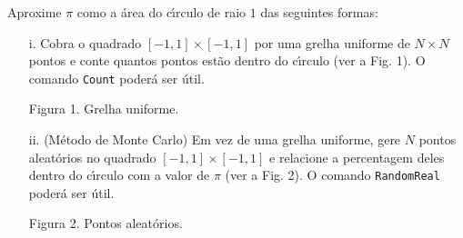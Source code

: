 \documentclass[11pt]{article}
\begin{document}
\begin{itemize}
  
 Aproxime $\pi$ como a \'area do c\'\i rculo de raio $1$ das seguintes formas:
   
        \begin{itemize}
        
        
        \item[{i.}] Cobra o quadrado $[-1,1] \times [-1,1]$  por uma grelha uniforme de $N\times N$ pontos
e conte quantos pontos est\~ao dentro do c\'\i rculo (ver a Fig. 1). O comando \texttt{Count} poder\'a ser \'util. 

\bigskip
\bigskip

\begin{minipage}{\textwidth}
\centering 
Figura 1. Grelha uniforme.
\end{minipage}

\pagebreak 
        \item[{ii.}]  (M\'etodo de Monte Carlo) Em vez de uma grelha uniforme, gere $N$ pontos aleat\'orios no quadrado $[-1,1] \times [-1,1]$ e relacione a percentagem deles dentro do c\'\i rculo com a valor de $\pi$ (ver a Fig. 2). O comando \texttt{RandomReal} poder\'a ser \'util.         
    
    
    \bigskip
\bigskip
    
        
\begin{minipage}{\textwidth}
\centering 
Figura 2. Pontos aleat\'orios.
\end{minipage}

 
 
        \end{itemize}
 
 




\end{itemize}
  




 
\end{document}
